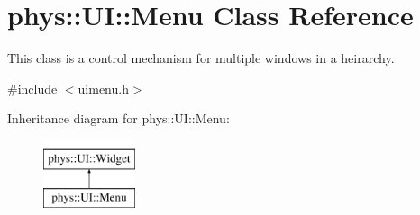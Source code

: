 \hypertarget{classphys_1_1UI_1_1Menu}{
\section{phys::UI::Menu Class Reference}
\label{d6/dd3/classphys_1_1UI_1_1Menu}
}


This class is a control mechanism for multiple windows in a heirarchy.  




{\ttfamily \#include $<$uimenu.h$>$}

Inheritance diagram for phys::UI::Menu:\begin{figure}[H]
\begin{center}
\leavevmode
\includegraphics[height=2cm]{d6/dd3/classphys_1_1UI_1_1Menu}
\end{center}
\end{figure}
